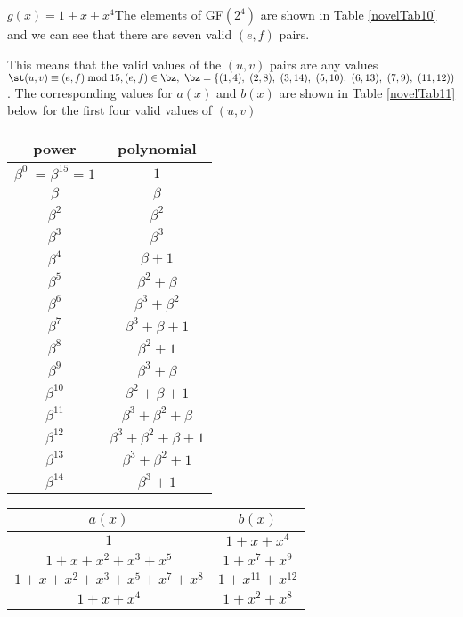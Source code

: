 \begin{example}
$g(x) = 1+x+x^4$\newline  The elements of GF$(2^4)$ are shown in Table \ref{novelTab10} and we can see that there are seven valid $(e,f)$ pairs.
 
 This means that the valid values of the $(u,v)$ pairs are any values $\st (u,v) \equiv (e,f) \bmod 15, (e,f) \in \bz,~\bz=\{(1,4),~(2,8) ,~(3,14) ,~(5,10) ,~(6,13) ,~(7,9) ,~(11,12))$.
 The corresponding values for $a(x)$ and $b(x)$ are shown in Table \ref{novelTab11} below for the first four valid values of $(u,v)$
 
  \begin{table*}[h]
 \caption{Non-zero Elements of GF$(2^4)$ generated by $g(x)=1+x+x^4$}
\centering
 \begin{tabular}{c c} 
 \hline
 power & polynomial \\ [0.5ex] 
 \hline\hline
$\beta^0~=\beta^{15}=1$ & $1$\\
\hline
$\beta$ & $\beta$\\
\hline
$\beta^2$ &  $\beta^2$\\
\hline
$\beta^3$ & $\beta^3$\\
\hline
$\beta^4$ &  $\beta+1$\\
\hline
$\beta^5$ & $\beta^2+\beta$\\
\hline
$\beta^6$ &  $\beta^3+\beta^2$\\
\hline
$\beta^7$ & $\beta^3+\beta+1$\\
\hline
$\beta^8$ &  $\beta^2+1$\\
\hline
$\beta^9$ & $\beta^3+\beta$\\
\hline
$\beta^{10}$ &  $\beta^2+\beta+1$\\
\hline
$\beta^{11}$ & $\beta^3+\beta^2+\beta$\\
\hline
$\beta^{12}$ &  $\beta^3+\beta^2+\beta+1$\\
\hline
$\beta^{13}$ & $\beta^3+\beta^2+1$\\
\hline
$\beta^{14}$ &  $\beta^3+1$\\
 \end{tabular}
 \label{novelTab10}
\end{table*}
 
 \begin{table*}[h]
 \caption{ $f(x)=1+x+x^4$}
\centering
 \begin{tabular}{c c} 
 \hline
 $a(x)$ & $b(x)$\\ [0.5ex] 
 \hline\hline
$1$ & $1+x+x^4$\\ 
\hline
$1+x+x^2+x^3+x^5$ & $1+x^7+x^9$ \\
\hline
$1+x+x^2+x^3+x^5+x^7+x^8$ & $1+x^{11}+x^{12}$\\
\hline
$1+x+x^4$ &$1+x^2+x^8$
 \end{tabular}
 \label{novelTab11}
\end{table*}
\end{example}

